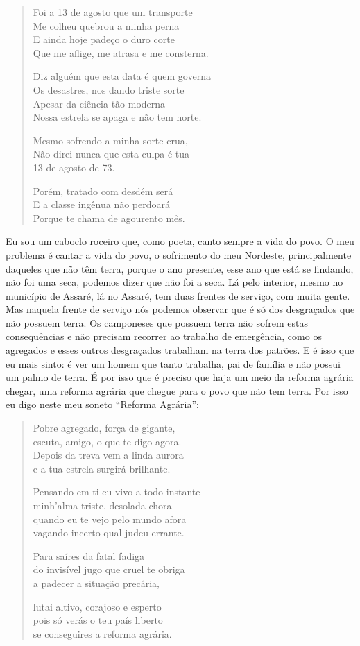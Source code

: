 \begin{verse}
Foi a 13 de agosto que um transporte\\
Me colheu quebrou a minha perna\\
E ainda hoje padeço o duro corte\\
Que me aflige, me atrasa e me consterna.

Diz alguém que esta data é quem governa\\
Os desastres, nos dando triste sorte\\
Apesar da ciência tão moderna\\
Nossa estrela se apaga e não tem norte.

Mesmo sofrendo a minha sorte crua,\\
Não direi nunca que esta culpa é tua\\
13 de agosto de 73.

Porém, tratado com desdém será\\
E a classe ingênua não perdoará\\
Porque te chama de agourento mês.
\end{verse}

Eu sou um caboclo roceiro que, como poeta, canto sempre a vida do
povo. O meu problema é cantar a vida do povo, o sofrimento do meu
Nordeste, principalmente daqueles que não têm terra, porque o ano
presente, esse ano que está se findando, não foi uma seca, podemos dizer
que não foi a seca. Lá pelo interior, mesmo no município de Assaré, lá
no Assaré, tem duas frentes de serviço, com muita gente. Mas naquela
frente de serviço nós podemos observar que é só dos desgraçados que
não possuem terra. Os camponeses que possuem terra não sofrem estas
consequências e não precisam recorrer ao trabalho de emergência, como
os agregados e esses outros desgraçados trabalham na terra dos patrões.
E é isso que eu mais sinto: é ver um homem que tanto trabalha, pai de
família e não possui um palmo de terra. É por isso que é preciso que
haja um meio da reforma agrária chegar, uma reforma agrária que chegue para o povo que não tem terra. Por isso eu digo neste meu soneto
``Reforma Agrária'':

\begin{verse}
Pobre agregado, força de gigante,\\
escuta, amigo, o que te digo agora.\\
Depois da treva vem a linda aurora\\
e a tua estrela surgirá brilhante.

Pensando em ti eu vivo a todo instante\\
minh'alma triste, desolada chora\\
quando eu te vejo pelo mundo afora\\
vagando incerto qual judeu errante.

Para saíres da fatal fadiga\\
do invisível jugo que cruel te obriga\\
a padecer a situação precária,

lutai altivo, corajoso e esperto\\
pois só verás o teu país liberto\\
se conseguires a reforma agrária.
\end{verse}

